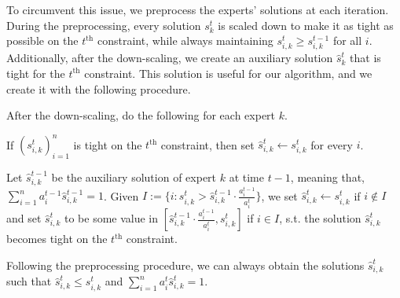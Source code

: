 To circumvent this issue, we preprocess the experts' solutions at each iteration. During the preprocessing, every solution $s_k^t$ is scaled down to make it as tight as possible on the $t^{\text{th}}$ constraint, while always maintaining $s_{i,k}^{t} \geq s_{i,k}^{t-1}$ for all $i$. Additionally, after the down-scaling, we create an auxiliary solution $\hat{s}_k^t$ that is tight for the $t^{\text{th}}$ constraint. This solution is useful for our algorithm, and we create it with the following procedure.

After the down-scaling, do the following for each expert $k$.
\begin{compactenum}
	\item If $(s_{i,k}^{t})_{i=1}^{n}$ is tight on the $t^{\text{th}}$ constraint, then set $\hat{s}_{i,k}^{t} \gets s_{i,k}^{t}$  for every $i$.
	\item Let $\hat{s}_{i,k}^{t-1}$ be the auxiliary solution of expert $k$ at time $t-1$, meaning that, $\sum_{i=1}^{n} a_{i}^{t-1} \hat{s}_{i,k}^{t-1} = 1$. Given $I := \{i: s_{i,k}^{t} > \hat{s}_{i,k}^{t-1} \cdot \frac{a_{i}^{t-1}}{a_{i}^{t}} \}$, we set $\hat{s}_{i,k}^{t} \gets s_{i,k}^{t}$ if $i \notin I$
	and set $\hat{s}_{i,k}^{t}$ to be some value in $[\hat{s}_{i,k}^{t-1} \cdot \frac{a_{i}^{t-1}}{a_{i}^{t}}, s_{i,k}^{t}]$ if $i \in I$, s.t. the solution $\hat{s}_{i,k}^{t}$
	becomes tight on the $t^{\text{th}}$ constraint.
\end{compactenum}
%
\begin{lemma}
Following the preprocessing procedure, we can always obtain the solutions $\hat{s}_{i,k}^{t}$ such that
$\hat{s}_{i,k}^{t} \leq s_{i,k}^{t}$ and $\sum_{i=1}^{n} a_{i}^{t} \hat{s}_{i,k}^{t} = 1$.
\end{lemma}
%
